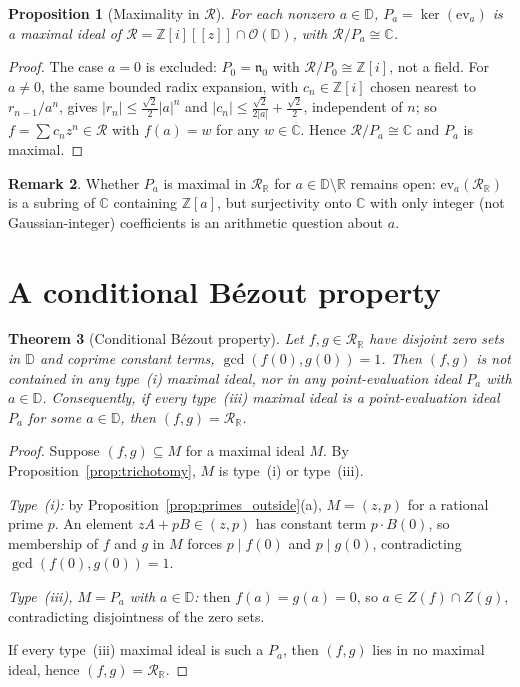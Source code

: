 \documentclass[12pt]{amsart}
\newtheorem{theorem}{Theorem}[section]
\newtheorem{proposition}[theorem]{Proposition}
\theoremstyle{definition}
\newtheorem{remark}[theorem]{Remark}
\newcommand{\D}{\mathbb{D}}
\newcommand{\Z}{\mathbb{Z}}
\newcommand{\Zi}{\mathbb{Z}[i]}
\newcommand{\C}{\mathbb{C}}
\newcommand{\R}{\mathbb{R}}
\newcommand{\abs}[1]{\left|#1\right|}
\newcommand{\OD}{\mathcal{O}(\D)}
\newcommand{\mR}{\mathcal{R}}
\newcommand{\mRR}{\mathcal{R}_{\mathbb{R}}}
\begin{document}
\begin{proposition}[Maximality in $\mR$]
\label{prop:pointeval_max_gaussian}
For each nonzero $a \in \D$, $P_a = \ker(\mathrm{ev}_a)$ is a maximal
ideal of $\mR = \Zi[[z]] \cap \OD$, with $\mR/P_a \cong \C$.
\end{proposition}

\begin{proof}
The case $a = 0$ is excluded: $P_0 = \mathfrak{n}_0$ with
$\mR/P_0 \cong \Zi$, not a field.  For $a \neq 0$, the same bounded radix
expansion, with $c_n \in \Zi$ chosen nearest to $r_{n-1}/a^n$, gives
$\abs{r_n} \leq \tfrac{\sqrt2}{2}\abs{a}^n$ and $\abs{c_n} \leq
\tfrac{\sqrt2}{2\abs{a}} + \tfrac{\sqrt2}{2}$, independent of $n$; so $f
= \sum c_n z^n \in \mR$ with $f(a) = w$ for any $w \in \C$.  Hence
$\mR/P_a \cong \C$ and $P_a$ is maximal.
\end{proof}

\begin{remark}
Whether $P_a$ is maximal in $\mRR$ for $a \in \D \setminus \R$ remains
open: $\mathrm{ev}_a(\mRR)$ is a subring of $\C$ containing $\Z[a]$, but
surjectivity onto $\C$ with only integer (not Gaussian-integer)
coefficients is an arithmetic question about $a$.
\end{remark}

\section{A conditional B\'ezout property}
\label{sec:bezout}

\begin{theorem}[Conditional B\'ezout property]
\label{thm:bezout}
Let $f, g \in \mRR$ have disjoint zero sets in $\D$ and coprime constant
terms, $\gcd(f(0), g(0)) = 1$.  Then $(f,g)$ is not contained in any
type~(i) maximal ideal, nor in any point-evaluation ideal $P_a$ with $a
\in \D$.  Consequently, if every type~(iii) maximal ideal is a
point-evaluation ideal $P_a$ for some $a \in \D$, then $(f,g) = \mRR$.
\end{theorem}

\begin{proof}
Suppose $(f,g) \subseteq M$ for a maximal ideal $M$.  By
Proposition~\ref{prop:trichotomy}, $M$ is type~(i) or type~(iii).

\emph{Type~(i):} by Proposition~\ref{prop:primes_outside}(a), $M =
(z,p)$ for a rational prime $p$.  An element $zA + pB \in (z,p)$ has
constant term $p \cdot B(0)$, so membership of $f$ and $g$ in $M$ forces
$p \mid f(0)$ and $p \mid g(0)$, contradicting $\gcd(f(0), g(0)) = 1$.

\emph{Type~(iii), $M = P_a$ with $a \in \D$:} then $f(a) = g(a) = 0$, so
$a \in Z(f) \cap Z(g)$, contradicting disjointness of the zero sets.

If every type~(iii) maximal ideal is such a $P_a$, then $(f,g)$ lies in
no maximal ideal, hence $(f,g) = \mRR$.
\end{proof}
\end{document}
